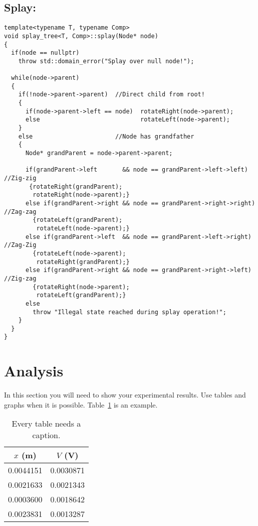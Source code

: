 \documentclass[letterpaper,12pt]{article}
\begin{document}
\subsection{Splay:}
\begin{lstlisting}
template<typename T, typename Comp>
void splay_tree<T, Comp>::splay(Node* node)
{
  if(node == nullptr)
    throw std::domain_error("Splay over null node!");

  while(node->parent)
  {
    if(!node->parent->parent)  //Direct child from root!
    {
      if(node->parent->left == node)  rotateRight(node->parent);
      else                            rotateLeft(node->parent);
    }
    else                       //Node has grandfather
    {
      Node* grandParent = node->parent->parent;

      if(grandParent->left       && node == grandParent->left->left)    //Zig-zig
       {rotateRight(grandParent);
        rotateRight(node->parent);}
      else if(grandParent->right && node == grandParent->right->right)  //Zag-zag
        {rotateLeft(grandParent);
         rotateLeft(node->parent);}
      else if(grandParent->left  && node == grandParent->left->right)   //Zag-Zig
        {rotateLeft(node->parent);
         rotateRight(grandParent);}
      else if(grandParent->right && node == grandParent->right->left)   //Zig-zag
        {rotateRight(node->parent);
         rotateLeft(grandParent);}
      else
        throw "Illegal state reached during splay operation!";
    }
  }
}
\end{lstlisting}

\section{Analysis}

In this section you will need to show your experimental results. Use tables and
graphs when it is possible. Table~\ref{tbl:bins} is an example.

\begin{table}[ht]
\begin{center}
\caption{Every table needs a caption.}
\label{tbl:bins} %
\begin{tabular}{|cc|} 
\hline
\multicolumn{1}{|c}{$x$ (m)} & \multicolumn{1}{c|}{$V$ (V)} \\
\hline
0.0044151 &   0.0030871 \\
0.0021633 &   0.0021343 \\
0.0003600 &   0.0018642 \\
0.0023831 &   0.0013287 \\
\hline
\end{tabular}
\end{center}
\end{table}
\end{document}
